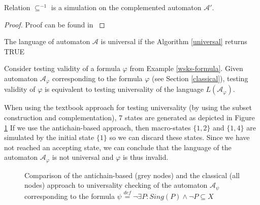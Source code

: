 \begin{lemma}\label{simulation-in-ca}
Relation $\subseteq^{-1}$ is a simulation on the complemented automaton
$\mathcal{A}'$.
\end{lemma}
\begin{proof}
 Proof can be found in \cite{raskin}
\end{proof}

\begin{lemma}
The language of automaton $\mathcal{A}$ is universal if the Algorithm
\ref{universal} returns \textsc{TRUE}
\end{lemma}

\noindent\hrulefill
\begin{example}
Consider testing validity of a formula $\varphi$ from Example
\ref{wsks-formula}.
Given automaton $\mathcal{A}_\varphi$ corresponding to the formula $\varphi$
(see Section \ref{classical}), testing validity of $\varphi$ is
equivalent to testing universality of the language $L(\mathcal{A}_\varphi)$.

When using the textbook approach for testing universality (by using the subset
construction and complementation), 7 states are generated as depicted in Figure
\ref{compare} If we use the antichain-based approach, then macro-states $\{1,
2\}$ and $\{1, 4\}$ are simulated by the initial state $\{1\}$ so we can
discard these states.
Since we have not reached an accepting state, we can conclude that the language
of the automaton $\mathcal{A}_\varphi$ is not universal and $\varphi$ is thus
invalid.
\end{example}

\noindent\hrulefill

\begin{figure}
 \begin{center}
 \end{center}
 \caption{Comparison of the antichain-based (grey nodes) and the classical (all
 nodes) approach to universality checking of the automaton $\mathcal{A}_\psi$
 corresponding to the formula $\psi \overset{\mathit{def}}{=} \neg\exists P:
 Sing(P) \wedge\neg P \subseteq X$}\label{compare}
\end{figure}


